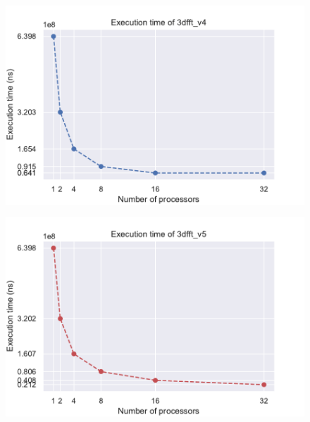 \begin{figure}[H]
\centering
\begin{minipage}{.5\textwidth}
  \centering
  \includegraphics[width=\linewidth]{./data/execution_v4.pdf}
  \label{fig:exec_v4}
\end{minipage}%
\begin{minipage}{.5\textwidth}
  \centering
  \includegraphics[width=\linewidth]{./data/execution_v5.pdf}
  \label{fig:exec_v5}
\end{minipage}
\end{figure}


